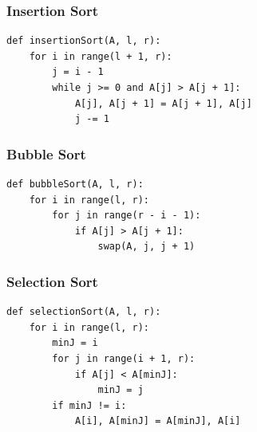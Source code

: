 \subsubsection{Insertion Sort}
\begin{codebox}
\begin{lstlisting}[style=CodeExpert]
def insertionSort(A, l, r):
    for i in range(l + 1, r):
        j = i - 1
        while j >= 0 and A[j] > A[j + 1]:
            A[j], A[j + 1] = A[j + 1], A[j]
            j -= 1
\end{lstlisting}
\end{codebox}

\subsubsection{Bubble Sort}
\begin{codebox}
\begin{lstlisting}[style=CodeExpert]
def bubbleSort(A, l, r):
    for i in range(l, r):
        for j in range(r - i - 1):
            if A[j] > A[j + 1]:
                swap(A, j, j + 1)
\end{lstlisting}
\end{codebox}


\subsubsection{Selection Sort}
\begin{codebox}
\begin{lstlisting}[style=CodeExpert]
def selectionSort(A, l, r):
    for i in range(l, r):
        minJ = i
        for j in range(i + 1, r):
            if A[j] < A[minJ]:
                minJ = j
        if minJ != i:
            A[i], A[minJ] = A[minJ], A[i]
\end{lstlisting}
\end{codebox}


